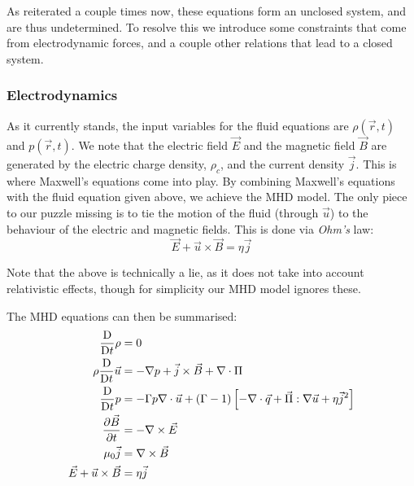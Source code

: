As reiterated a couple times now, these equations form an unclosed system, and are thus undetermined. 
To resolve this we introduce some constraints that come from electrodynamic forces, and a couple other 
relations that lead to a closed system.

\subsubsection{Electrodynamics}

As it currently stands, the input variables for the fluid equations are $\rho(\vec{r}, t)$ and $p(\vec{r}, t)$. We note that 
the electric field $\vec{E}$ and the magnetic field $\vec{B}$ are generated by the electric charge density, $\rho_c$, and 
the current density $\vec{j}$. This is where Maxwell's equations come into play. By combining Maxwell's equations with the 
fluid equation given above, we achieve the MHD model. The only piece to our puzzle missing is to tie the motion of the fluid 
(through $\vec{u}$) to the behaviour of the electric and magnetic fields. This is done via \textit{Ohm's} law:
\begin{equation}
    \vec{E} + \vec{u} \times \vec{B} = \eta \vec{j}
\end{equation}
\begin{remark}
    Note that the above is technically a lie, as it does not take into account relativistic effects, though for simplicity 
    our MHD model ignores these.
\end{remark}


\begin{definition}
    The MHD equations can then be summarised:
    \begin{align}
        \frac{\text{D}}{\text{D} t} \rho &= 0 \\
        \rho \frac{\text{D}}{\text{D} t} \vec{u} &= -\nabla p + \vec{j} \times \vec{B} + \nabla \cdot \Pi \\
        \frac{\text{D}}{\text{D} t} p  &= -\Gamma p \nabla \cdot \vec{u} + (\Gamma - 1) \left [ -\nabla \cdot \vec{q} + \vec{\Pi} : \nabla \vec{u} + \eta \vec{j}^2 \right ] \\
        \pdv{\vec{B}}{t} &= -\nabla \times \vec{E} \\
        \mu_0 \vec{j} &= \nabla \times \vec{B} \\
        \vec{E} + \vec{u} \times \vec{B} &= \eta \vec{j}
    \end{align}
\end{definition}

